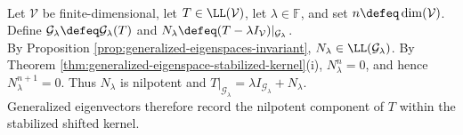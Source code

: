 \begin{illustrationfigure}[H]
  \centering
  
  \caption{Extending bases through the kernel filtration makes $N$ move vectors to earlier layers.}
  \label{fig:nilpotent-filtration-basis}
\end{illustrationfigure}

\begin{perspective} \label{per:generalized-eigenvectors-as-nilpotent-data} \\
Let $\mathcal{V}$ be finite-dimensional, let $T\in\LL(\mathcal{V})$, let $\lambda\in\mathbb{F}$, and set $n\defeq\dim(\mathcal{V})$. Define $\mathcal{G}_{\lambda}\defeq\mathcal{G}_{\lambda}(T)$ and $N_{\lambda}\defeq(T-\lambda I_{\mathcal{V}})|_{\mathcal{G}_{\lambda}}$.\\
By Proposition \ref{prop:generalized-eigenspaces-invariant}, $N_{\lambda}\in\LL(\mathcal{G}_{\lambda})$. By Theorem \ref{thm:generalized-eigenspace-stabilized-kernel}(i), $N_{\lambda}^n=0$, and hence $N_{\lambda}^{n+1}=0$. Thus $N_{\lambda}$ is nilpotent and $T|_{\mathcal{G}_{\lambda}}=\lambda I_{\mathcal{G}_{\lambda}}+N_{\lambda}$.\\
Generalized eigenvectors therefore record the nilpotent component of $T$ within the stabilized shifted kernel.
\end{perspective}
